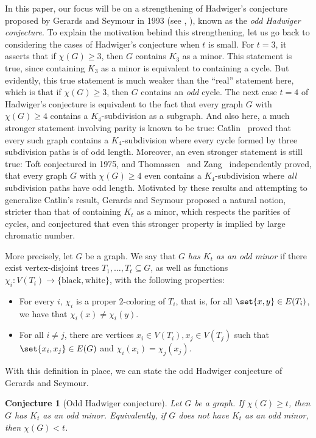 \documentclass[11pt,reqno,oneside]{amsart}
\newtheorem{conjecture}[theorem]{Conjecture}
\theoremstyle{definition}
\newcommand\1{\mathbf{1}}
\let\geq\geqslant
\begin{document}
In this paper, our focus will be on a strengthening of Hadwiger's conjecture proposed by Gerards and Seymour in 1993 (see \cite[Section 6.5]{MR1304254}, \cite[Section 7]{MR3526944}), known as the \emph{odd Hadwiger conjecture}. To explain the motivation behind this strengthening, let us go back to considering the cases of Hadwiger's conjecture when $t$ is small. For $t=3$, it asserts that if $\chi(G)\geq 3$, then $G$ contains $K_3$ as a minor. This statement is true, since containing $K_3$ as a minor is equivalent to containing a cycle. But evidently, this true statement is much weaker than the ``real'' statement here, which is that if $\chi(G)\geq 3$, then $G$ contains an \emph{odd} cycle. The next case $t=4$ of Hadwiger's conjecture is equivalent to the fact that every graph $G$ with $\chi(G)\geq 4$ contains a $K_4$-subdivision as a subgraph. And also here, a much stronger statement involving parity is known to be true: Catlin~\cite{MR532593} proved that every such graph contains a $K_4$-subdivision where every cycle formed by three subdivision paths is of odd length. Moreover, an even stronger statement is still true: Toft conjectured in 1975, and Thomassen~\cite{MR1848060} and Zang~\cite{MR1631313} independently proved, that every graph $G$ with $\chi(G)\geq 4$ even contains a $K_4$-subdivision where \emph{all} subdivision paths have odd length. Motivated by these results and attempting to generalize Catlin's result, Gerards and Seymour proposed a natural notion, stricter than that of containing $K_t$ as a minor, which respects the parities of cycles, and conjectured that even this stronger property is implied by large chromatic number.

More precisely,
let $G$ be a graph. We say that $G$ \emph{has $K_t$ as an odd minor} if there exist vertex-disjoint trees $T_1,\dots,T_t\subseteq G$, as well as functions $\chi_i:V(T_i) \to \{\text{black},\text{white}\}$, with the following properties:
\begin{itemize}
	\item For every $i$, $\chi_i$ is a proper $2$-coloring of $T_i$, that is, for all $\set{x,y} \in E(T_i)$, we have that $\chi_i(x)\neq \chi_i(y)$.
	\item For all $i \neq j$, there are vertices $x_i \in V(T_i), x_j \in V(T_j)$ such that $\set{x_i, x_j} \in E(G)$ and $\chi_i(x_i)=\chi_j(x_j)$. 
\end{itemize}
With this definition in place, we can state the odd Hadwiger conjecture of Gerards and Seymour.
\begin{conjecture}[Odd Hadwiger conjecture]\label{conj:odd hadwiger}
	Let $G$ be a graph.
If $\chi(G)\geq t$, then $G$ has $K_t$ as an odd minor. Equivalently, if $G$ does not have $K_t$ as an odd minor, then $\chi(G)<t$. 
\end{conjecture}
\end{document}
